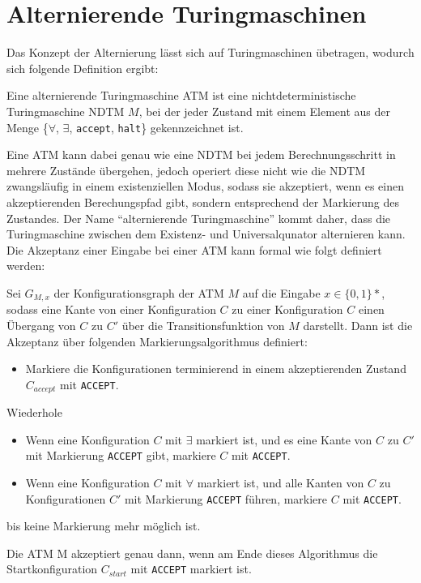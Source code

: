 \section{Alternierende Turingmaschinen} \label{section: alternierende Turingmaschine}
Das Konzept der Alternierung lässt sich auf Turingmaschinen übetragen, wodurch sich folgende Definition ergibt:
\begin{definition}\cite{pass_lecture_nodate}
    Eine alternierende Turingmaschine ATM ist eine nichtdeterministische Turingmaschine NDTM $M$, bei der jeder Zustand mit einem 
    Element aus der Menge \{$\forall$, $\exists$, \texttt{accept}, \texttt{halt}\} gekennzeichnet ist.
\end{definition}

Eine ATM kann dabei genau wie eine NDTM bei jedem Berechnungsschritt in mehrere Zustände übergehen, jedoch operiert diese nicht
wie die NDTM zwangsläufig in einem existenziellen Modus, sodass sie akzeptiert, wenn es einen akzeptierenden Berechungspfad gibt, sondern entsprechend der Markierung des Zustandes.
Der Name \enquote{alternierende Turingmaschine} kommt daher, dass die Turingmaschine zwischen dem Existenz- und Universalqunator alternieren kann.
Die Akzeptanz einer Eingabe bei einer ATM kann formal wie folgt definiert werden:
\begin{definition}\cite{arora_computational_2009}
    Sei $G_{M, x}$ der Konfigurationsgraph der ATM $M$ auf die Eingabe $x \in \{0,1\}*$, sodass eine Kante von einer Konfiguration $C$ zu 
    einer Konfiguration $C$ einen Übergang von $C$ zu $C'$ über die Transitionsfunktion von $M$ darstellt. Dann ist die Akzeptanz über folgenden
    Markierungsalgorithmus definiert:

    \begin{itemize}
        \item Markiere die Konfigurationen terminierend in einem akzeptierenden Zustand $C_{accept}$ mit \texttt{ACCEPT}.
    \end{itemize}
    Wiederhole
    \begin{itemize}        
        \item Wenn eine Konfiguration $C$ mit $\exists$ markiert ist, und es eine Kante von $C$ zu $C'$ mit Markierung \texttt{ACCEPT} gibt, markiere $C$ mit \texttt{ACCEPT}.
        \item Wenn eine Konfiguration $C$ mit $\forall$ markiert ist, und alle Kanten von $C$ zu Konfigurationen $C'$ mit Markierung \texttt{ACCEPT} führen, markiere $C$ mit \texttt{ACCEPT}.
    \end{itemize}
    bis keine Markierung mehr möglich ist.

    Die ATM M akzeptiert genau dann, wenn am Ende dieses Algorithmus die Startkonfiguration $C_{start}$ mit \texttt{ACCEPT} markiert ist.
\end{definition}
